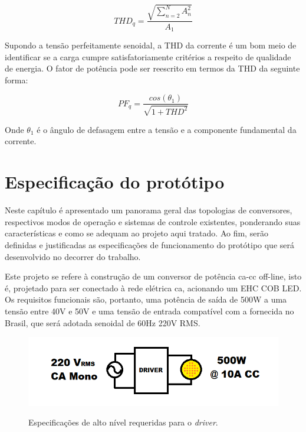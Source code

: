 \documentclass[
        12pt,
        openany, %
        oneside, %
        a4paper,			
        english,			
        brazil
        ]{abntbibufjf}
\begin{document}
\begin{equation}
THD_q=\frac{\sqrt{ \sum_{n=2}^{N}A_n^2 }}{A_1}
\label{thd}
\end{equation}

Supondo a tensão perfeitamente senoidal, a THD da corrente é um bom meio de identificar se a carga cumpre satisfatoriamente critérios a respeito de qualidade de energia. O fator de potência pode ser reescrito em termos da THD da seguinte forma:

\begin{equation}
PF_q=\frac{cos(\theta_1)}{\sqrt{ 1+THD^2 } }
\end{equation}

Onde $\theta_1$ é o ângulo de defasagem entre a tensão e a componente fundamental da corrente.



\chapter{Especificação do protótipo}

Neste capítulo é apresentado um panorama geral das topologias de conversores, respectivos modos de operação e sistemas de controle existentes, ponderando suas características e como se adequam ao projeto aqui tratado. Ao fim, serão definidas e justificadas as especificações de funcionamento do protótipo que será desenvolvido no decorrer do trabalho.

Este projeto se refere à construção de um conversor de potência ca-cc off-line, isto é, projetado para ser conectado à rede elétrica ca, acionando um EHC COB LED. Os requisitos funcionais são, portanto, uma potência de saída de 500W a uma tensão entre 40V e 50V e uma tensão de entrada compatível com a fornecida no Brasil, que será adotada senoidal de 60Hz 220V RMS.


\begin{figure}[h]
	\centering
	\caption{Especificações de alto nível requeridas para o \textit{driver}.}
	\includegraphics[scale=.8]{../ESQUEMAS/spec.png}\\
\end{figure}
\end{document}

